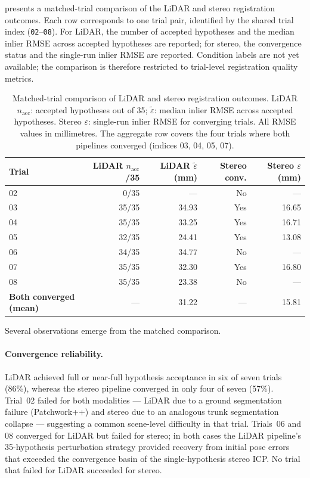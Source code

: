  presents a matched-trial comparison of the LiDAR and stereo registration outcomes. Each row corresponds to one trial pair, identified by the shared trial index (\texttt{02}--\texttt{08}). For LiDAR, the number of accepted hypotheses and the median inlier RMSE across accepted hypotheses are reported; for stereo, the convergence status and the single-run inlier RMSE are reported. Condition labels are not yet available; the comparison is therefore restricted to trial-level registration quality metrics.

\begin{table}[htbp]
  \centering
  \small
  \setlength{\tabcolsep}{4pt}
  \caption{Matched-trial comparison of LiDAR and stereo registration outcomes. LiDAR $n_\text{acc}$: accepted hypotheses out of 35; $\tilde{\varepsilon}$: median inlier RMSE across accepted hypotheses. Stereo $\varepsilon$: single-run inlier RMSE for converging trials. All RMSE values in millimetres. The aggregate row covers the four trials where both pipelines converged (indices 03, 04, 05, 07).}
  \label{tab:pa-results-cross-modal}
  \begin{tabular}{@{} l r r r r @{}}
    \toprule
    \textbf{Trial} &
    \textbf{LiDAR} \boldmath$n_\text{acc}$\textbf{/35} &
    \textbf{LiDAR} \boldmath$\tilde{\varepsilon}$ \textbf{(mm)} &
    \textbf{Stereo conv.} &
    \textbf{Stereo} \boldmath$\varepsilon$ \textbf{(mm)} \\
    \midrule
    02 &  0/35 &    --- & No  &    --- \\
    03 & 35/35 & 34.93  & Yes & 16.65  \\
    04 & 35/35 & 33.25  & Yes & 16.71  \\
    05 & 32/35 & 24.41  & Yes & 13.08  \\
    06 & 34/35 & 34.77  & No  &    --- \\
    07 & 35/35 & 32.30  & Yes & 16.80  \\
    08 & 35/35 & 23.38  & No  &    --- \\
    \midrule
    \textbf{Both converged (mean)} & --- & 31.22 & --- & 15.81 \\
    \bottomrule
  \end{tabular}
\end{table}

Several observations emerge from the matched comparison.

\paragraph{Convergence reliability.} LiDAR achieved full or near-full hypothesis acceptance in six of seven trials (86\%), whereas the stereo pipeline converged in only four of seven (57\%). Trial~02 failed for both modalities --- LiDAR due to a ground segmentation failure (Patchwork++) and stereo due to an analogous trunk segmentation collapse --- suggesting a common scene-level difficulty in that trial. Trials~06 and 08 converged for LiDAR but failed for stereo; in both cases the LiDAR pipeline's 35-hypothesis perturbation strategy provided recovery from initial pose errors that exceeded the convergence basin of the single-hypothesis stereo ICP. No trial that failed for LiDAR succeeded for stereo.

